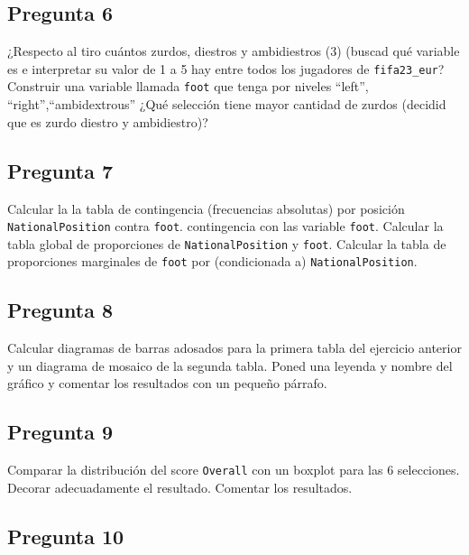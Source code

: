\documentclass[
]{article}
\begin{document}
\hypertarget{pregunta-6}{%
\subsection{Pregunta 6}\label{pregunta-6}}

¿Respecto al tiro cuántos zurdos, diestros y ambidiestros (3) (buscad
qué variable es e interpretar su valor de 1 a 5 hay entre todos los
jugadores de \texttt{fifa23\_eur}? Construir una variable llamada
\texttt{foot} que tenga por niveles ``left'', ``right'',``ambidextrous''
¿Qué selección tiene mayor cantidad de zurdos (decidid que es zurdo
diestro y ambidiestro)?

\hypertarget{pregunta-7}{%
\subsection{Pregunta 7}\label{pregunta-7}}

Calcular la la tabla de contingencia (frecuencias absolutas) por
posición \texttt{NationalPosition} contra \texttt{foot}. contingencia
con las variable \texttt{foot}. Calcular la tabla global de proporciones
de \texttt{NationalPosition} y \texttt{foot}. Calcular la tabla de
proporciones marginales de \texttt{foot} por (condicionada a)
\texttt{NationalPosition}.

\hypertarget{pregunta-8}{%
\subsection{Pregunta 8}\label{pregunta-8}}

Calcular diagramas de barras adosados para la primera tabla del
ejercicio anterior y un diagrama de mosaico de la segunda tabla. Poned
una leyenda y nombre del gráfico y comentar los resultados con un
pequeño párrafo.

\hypertarget{pregunta-9}{%
\subsection{Pregunta 9}\label{pregunta-9}}

Comparar la distribución del score \texttt{Overall} con un boxplot para
las 6 selecciones. Decorar adecuadamente el resultado. Comentar los
resultados.

\hypertarget{pregunta-10}{%
\subsection{Pregunta 10}\label{pregunta-10}}
\end{document}
